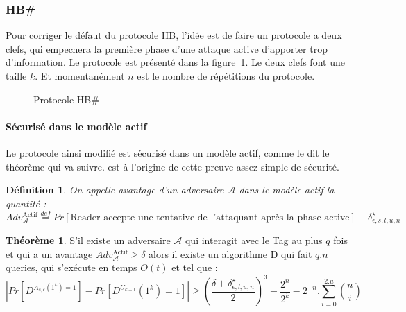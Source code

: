 \documentclass{article}		%
\newtheorem{defi}{Définition}
\theoremstyle{definition}
\newtheorem{theo}{Théorème}
\theoremstyle{plain}
\theoremstyle{plain}
\theoremstyle{plain}
\theoremstyle{plain}
\theoremstyle{plain}
\begin{document}
\subsubsection{HB\#}
Pour corriger le défaut du protocole HB, l'idée est de faire un protocole
a deux clefs, qui empechera la première phase d'une attaque active
d'apporter trop d'information. Le protocole est présenté dans la
figure~\ref{hbsharp}. Le deux clefs font une taille $k$. Et momentanément
$n$ est le nombre de répétitions du protocole. 
\begin{figure}
\centering
{}
\caption{Protocole HB\#}
\label{hbsharp}
\end{figure}
\paragraph{Sécurisé dans le modèle actif}
Le protocole ainsi modifié est sécurisé dans un modèle actif, comme le
dit le théorème qui va suivre.
\cite{Katz} est à l'origine de cette preuve assez simple de sécurité.
\begin{defi}
On appelle avantage d'un adversaire $\mathcal{A}$ dans le modèle actif la
quantité :
$$Adv_{\mathcal{A}}^{\text{Actif}} \stackrel{def}{=} Pr[\text{Reader accepte une
tentative de l'attaquant après la phase active}]-\delta^{\star}_{\epsilon,s,l,u,n}$$
\end{defi}

\begin{theo}
S'il existe un adversaire $\mathcal{A}$ qui interagit avec le Tag au plus $q$ fois
 et qui a un avantage
$Adv_{\mathcal{A}}^{\text{Actif}}\geq \delta$ alors il existe un
algorithme D qui fait $q.n$ queries, qui s'exécute en temps $O(t)$ et tel
que : 
$$|Pr[D^{A_{s,\epsilon}(1^k)=1}] - Pr[D^{U_{k+1}}(1^k)=1]| \geq
(\frac{\delta+\delta_{\epsilon,l,u,n}^{\star}}{2})^3 - \frac{2^n}{2^k}
-2^{-n}.\sum_{i=0}^{2.u} \binom{n}{i} $$
\end{theo}
\end{document}
